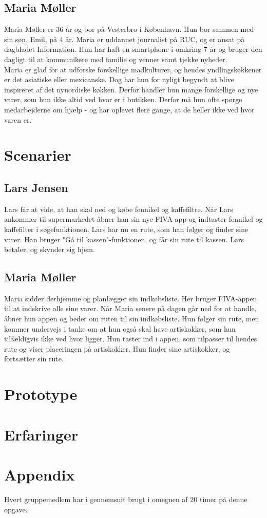 \documentclass[12pt]{article}
\begin{document}
\subsection{Maria Møller}

\noindent Maria Møller er 36 år og bor på Vesterbro i København. Hun bor sammen med sin søn, Emil, på 4 år. Maria er uddannet journalist på RUC, og er ansat på dagbladet Information. Hun har haft en smartphone i omkring 7 år og bruger den dagligt til at kommunikere med familie og venner samt tjekke nyheder.\\

\noindent Maria er glad for at udforske forskellige madkulturer, og hendes yndlingskøkkener er det asiatiske eller mexicanske. Dog har hun for nyligt begyndt at blive inspireret af det nynordiske køkken. Derfor handler hun mange forskellige og nye varer, som hun ikke altid ved hvor er i butikken. Derfor må hun ofte spørge medarbejderne om hjælp - og har oplevet flere gange, at de heller ikke ved hvor varen er.

\section{Scenarier}

\subsection{Lars Jensen}
Lars får at vide, at han skal ned og købe fennikel og kaffefiltre. Når Lars ankommer til supermarkedet åbner han sin nye FIVA-app og indtaster fennikel og kaffefilter i søgefunktionen. Lars har nu en rute, som han følger og finder sine varer. Han bruger "Gå til kassen"-funktionen, og får sin rute til kassen. Lars betaler, og skynder sig hjem.

\subsection{Maria Møller}
Maria sidder derhjemme og planlægger sin indkøbsliste. Her bruger FIVA-appen til at indskrive alle sine varer. Når Maria senere på dagen går ned for at handle, åbner hun appen og beder om ruten til sin indkøbsliste. Hun følger sin rute, men kommer undervejs i tanke om at hun også skal have artiskokker, som hun tilfældigvis ikke ved hvor ligger. Hun taster ind i appen, som tilpasser til hendes rute og viser placeringen på artiskokker. Hun finder sine artiskokker, og fortsætter sin rute.

\newpage

\section{Prototype}




\newpage

\section{Erfaringer}

\section{Appendix}

Hvert gruppemedlem har i gennemsnit brugt i omegnen af 20 timer på denne opgave.
\end{document}
